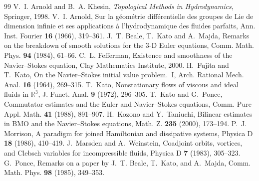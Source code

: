 \documentclass[11pt,reqno]{amsart}
\theoremstyle{definition}
\newcommand{\R}{\mathbb{R}}\newcommand{\T}{\mathbb{T}^3}\newcommand{\Z}{\mathbb{Z}}
\begin{document}
\begin{thebibliography}{99}
 V.~I. Arnold and B.~A. Khesin, \emph{Topological Methods in Hydrodynamics}, Springer, 1998.
 V.~I. Arnold, Sur la g\'eom\'etrie diff\'erentielle des groupes de Lie de dimension infinie et ses applications \`a l'hydrodynamique des fluides parfaits, Ann. Inst. Fourier \textbf{16} (1966), 319--361.
 J.~T. Beale, T.~Kato and A.~Majda, Remarks on the breakdown of smooth solutions for the 3-D Euler equations, Comm. Math. Phys. \textbf{94} (1984), 61--66.
 C.~L. Fefferman, Existence and smoothness of the Navier--Stokes equation, Clay Mathematics Institute, 2000.
 H.~Fujita and T.~Kato, On the Navier--Stokes initial value problem.~I, Arch. Rational Mech. Anal. \textbf{16} (1964), 269--315.
 T.~Kato, Nonstationary flows of viscous and ideal fluids in $\R^3$, J. Funct. Anal. \textbf{9} (1972), 296--305.
 T.~Kato and G.~Ponce, Commutator estimates and the Euler and Navier--Stokes equations, Comm. Pure Appl. Math. \textbf{41} (1988), 891--907.
 H.~Kozono and Y.~Taniuchi, Bilinear estimates in BMO and the Navier--Stokes equations, Math. Z. \textbf{235} (2000), 173--194.
 P.~J. Morrison, A paradigm for joined Hamiltonian and dissipative systems, Physica D \textbf{18} (1986), 410--419.
 J.~Marsden and A.~Weinstein, Coadjoint orbits, vortices, and Clebsch variables for incompressible fluids, Physica D \textbf{7} (1983), 305--323.
 G.~Ponce, Remarks on a paper by J.~T. Beale, T.~Kato, and A.~Majda, Comm. Math. Phys. \textbf{98} (1985), 349--353.
\end{thebibliography}
\end{document}
